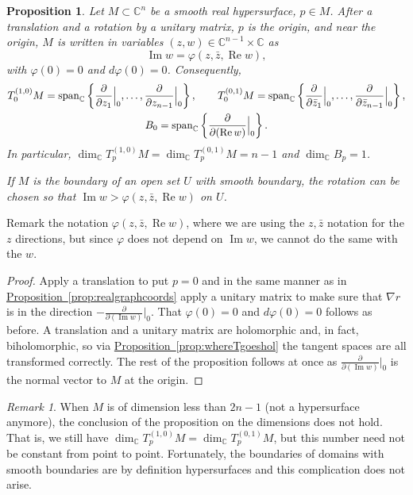 \documentclass[12pt,openany]{book}
\newcommand{\avoidbreak}{\postdisplaypenalty=100}
\renewcommand{\Re}{\operatorname{Re}}
\renewcommand{\Im}{\operatorname{Im}}
\newcommand{\C}{{\mathbb{C}}}
\theoremstyle{plain}
\newtheorem{prop}[thm]{Proposition}
\theoremstyle{remark}
\newtheorem{remark}[thm]{Remark}
\theoremstyle{definition}
\theoremstyle{exercise}
\theoremstyle{example}
\newcommand{\propref}[1]{\hyperref[#1]{Proposition~\ref*{#1}}}
\begin{document}
\begin{prop} \label{prop:graphcoordinatesCn}
\pagebreak[2]
Let $M \subset \C^n$ be a smooth real hypersurface, $p \in M$.
After a translation and a rotation by a unitary
matrix, $p$ is the origin, and near the origin,
$M$ is written in variables $(z,w) \in \C^{n-1}
\times \C$ as
\begin{equation*}
\Im w = \varphi(z,\bar{z},\Re w) ,
\end{equation*}
with $\varphi(0) = 0$  and $d\varphi(0) = 0$.  Consequently,
\begin{gather*}
T_0^{(1,0)} M
= \operatorname{span}_{\C} \left\{
\frac{\partial}{\partial z_1}\Big|_0,
\ldots,
\frac{\partial}{\partial z_{n-1}}\Big|_0 \right\} ,
\qquad
T_0^{(0,1)} M
= \operatorname{span}_{\C} \left\{
\frac{\partial}{\partial \bar{z}_1}\Big|_0,
\ldots,
\frac{\partial}{\partial \bar{z}_{n-1}}\Big|_0 \right\} ,
\\
B_0 = \operatorname{span}_{\C} \left\{
\frac{\partial}{\partial (\Re w)}\Big|_0 \right\} .
\avoidbreak
\end{gather*}
In particular,
$\dim_\C T_p^{(1,0)} M = \dim_\C T_p^{(0,1)} M = n-1$ and
$\dim_\C B_p = 1$.

\nopagebreak
If $M$ is the boundary of an open set $U$ with smooth boundary,
the rotation can be chosen so that
$\Im w > \varphi(z,\bar{z},\Re w)$ on $U$.
\end{prop}

Remark the notation $\varphi(z,\bar{z},\Re w)$, where we are using the
$z,\bar{z}$ notation for the $z$ directions, but since $\varphi$ does not
depend on $\Im w$, we cannot do the same with the $w$.

\begin{proof}
\pagebreak[2]
Apply a translation to put $p=0$ and in the
same manner as in \propref{prop:realgraphcoords}
apply a unitary matrix to make sure that $\nabla r$ is
in the direction
$-\frac{\partial}{\partial (\Im w)}\big|_0$.  That $\varphi(0) = 0$
and $d\varphi(0) = 0$ follows as before.
A translation and a unitary matrix are holomorphic
and, in fact, biholomorphic, so
via \propref{prop:whereTgoeshol} the tangent spaces are all
transformed correctly.
The rest of the proposition follows at once as
$\frac{\partial}{\partial (\Im w)}\big|_0$ is the normal vector to $M$
at the origin.
\end{proof}

\begin{remark}
When $M$ is of dimension less than $2n-1$ (not a hypersurface anymore),
the conclusion of the
proposition on the dimensions does not hold.
That is, we still have $\dim_\C T_p^{(1,0)} M = \dim_\C T_p^{(0,1)}
M$, but this number need not be constant from point to point.  Fortunately,
the boundaries of domains with smooth boundaries are by definition
hypersurfaces and this complication does not arise.
\end{remark}
\end{document}
